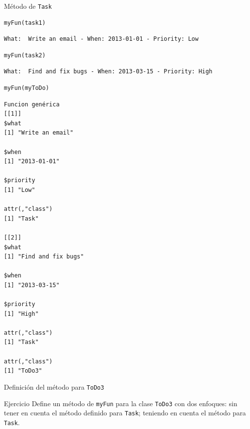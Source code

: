 \documentclass[xcolor={usenames,svgnames,dvipsnames}]{beamer}
\begin{document}
\begin{frame}[label={sec:org44e8a52},fragile]{Método de \texttt{Task}}
 \lstset{language=r,label= ,caption= ,captionpos=b,numbers=none}
\begin{lstlisting}
myFun(task1)
\end{lstlisting}

\begin{verbatim}
What:  Write an email - When: 2013-01-01 - Priority: Low
\end{verbatim}


\lstset{language=r,label= ,caption= ,captionpos=b,numbers=none}
\begin{lstlisting}
myFun(task2)
\end{lstlisting}

\begin{verbatim}
What:  Find and fix bugs - When: 2013-03-15 - Priority: High
\end{verbatim}


\lstset{language=r,label= ,caption= ,captionpos=b,numbers=none}
\begin{lstlisting}
myFun(myToDo)
\end{lstlisting}

\begin{verbatim}
Funcion genérica
[[1]]
$what
[1] "Write an email"

$when
[1] "2013-01-01"

$priority
[1] "Low"

attr(,"class")
[1] "Task"

[[2]]
$what
[1] "Find and fix bugs"

$when
[1] "2013-03-15"

$priority
[1] "High"

attr(,"class")
[1] "Task"

attr(,"class")
[1] "ToDo3"
\end{verbatim}
\end{frame}

\begin{frame}[label={sec:org8f8e755},fragile]{Definición del método para \texttt{ToDo3}}
 \begin{block}{Ejercicio}
Define un método de \texttt{myFun} para la clase \texttt{ToDo3} con dos enfoques: sin tener en cuenta el método definido para \texttt{Task}; teniendo en cuenta el método para \texttt{Task}.
\end{block}
\end{frame}
\end{document}
